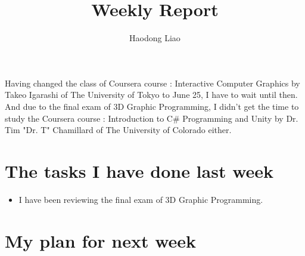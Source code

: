\documentclass[a4paper]{report}
\title{Weekly Report}
\author{Haodong Liao}
\begin{document}
\maketitle{}

\quad Having changed the class of Coursera course : Interactive Computer Graphics by Takeo Igarashi of The University of Tokyo to June 25, I have to wait until then. And due to the final exam of 3D Graphic Programming, I didn't get the time to study the Coursera course : Introduction to C\# Programming and Unity by  Dr. Tim "Dr. T" Chamillard of The University of Colorado either.

\section{The tasks I have done last week}
\begin{itemize}%






\item I have been reviewing the final exam of 3D Graphic Programming.


\end{itemize}

\section{My plan for next week}
\end{document}
